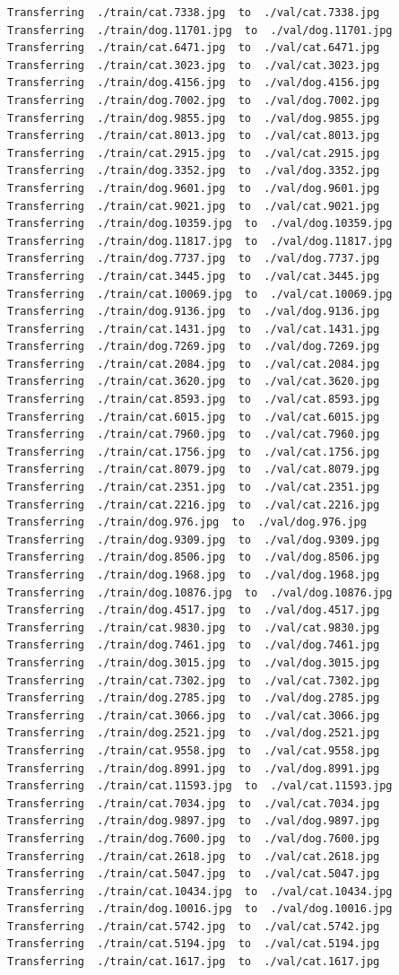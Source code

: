 \documentclass[]{book}
\theoremstyle{definition}
\theoremstyle{definition}
\theoremstyle{definition}
\theoremstyle{remark}
\begin{document}
\begin{verbatim}
Transferring  ./train/cat.7338.jpg  to  ./val/cat.7338.jpg
Transferring  ./train/dog.11701.jpg  to  ./val/dog.11701.jpg
Transferring  ./train/cat.6471.jpg  to  ./val/cat.6471.jpg
Transferring  ./train/cat.3023.jpg  to  ./val/cat.3023.jpg
Transferring  ./train/dog.4156.jpg  to  ./val/dog.4156.jpg
Transferring  ./train/dog.7002.jpg  to  ./val/dog.7002.jpg
Transferring  ./train/dog.9855.jpg  to  ./val/dog.9855.jpg
Transferring  ./train/cat.8013.jpg  to  ./val/cat.8013.jpg
Transferring  ./train/cat.2915.jpg  to  ./val/cat.2915.jpg
Transferring  ./train/dog.3352.jpg  to  ./val/dog.3352.jpg
Transferring  ./train/dog.9601.jpg  to  ./val/dog.9601.jpg
Transferring  ./train/cat.9021.jpg  to  ./val/cat.9021.jpg
Transferring  ./train/dog.10359.jpg  to  ./val/dog.10359.jpg
Transferring  ./train/dog.11817.jpg  to  ./val/dog.11817.jpg
Transferring  ./train/dog.7737.jpg  to  ./val/dog.7737.jpg
Transferring  ./train/cat.3445.jpg  to  ./val/cat.3445.jpg
Transferring  ./train/cat.10069.jpg  to  ./val/cat.10069.jpg
Transferring  ./train/dog.9136.jpg  to  ./val/dog.9136.jpg
Transferring  ./train/cat.1431.jpg  to  ./val/cat.1431.jpg
Transferring  ./train/dog.7269.jpg  to  ./val/dog.7269.jpg
Transferring  ./train/cat.2084.jpg  to  ./val/cat.2084.jpg
Transferring  ./train/cat.3620.jpg  to  ./val/cat.3620.jpg
Transferring  ./train/cat.8593.jpg  to  ./val/cat.8593.jpg
Transferring  ./train/cat.6015.jpg  to  ./val/cat.6015.jpg
Transferring  ./train/cat.7960.jpg  to  ./val/cat.7960.jpg
Transferring  ./train/cat.1756.jpg  to  ./val/cat.1756.jpg
Transferring  ./train/cat.8079.jpg  to  ./val/cat.8079.jpg
Transferring  ./train/cat.2351.jpg  to  ./val/cat.2351.jpg
Transferring  ./train/cat.2216.jpg  to  ./val/cat.2216.jpg
Transferring  ./train/dog.976.jpg  to  ./val/dog.976.jpg
Transferring  ./train/dog.9309.jpg  to  ./val/dog.9309.jpg
Transferring  ./train/dog.8506.jpg  to  ./val/dog.8506.jpg
Transferring  ./train/dog.1968.jpg  to  ./val/dog.1968.jpg
Transferring  ./train/dog.10876.jpg  to  ./val/dog.10876.jpg
Transferring  ./train/dog.4517.jpg  to  ./val/dog.4517.jpg
Transferring  ./train/cat.9830.jpg  to  ./val/cat.9830.jpg
Transferring  ./train/dog.7461.jpg  to  ./val/dog.7461.jpg
Transferring  ./train/dog.3015.jpg  to  ./val/dog.3015.jpg
Transferring  ./train/cat.7302.jpg  to  ./val/cat.7302.jpg
Transferring  ./train/dog.2785.jpg  to  ./val/dog.2785.jpg
Transferring  ./train/cat.3066.jpg  to  ./val/cat.3066.jpg
Transferring  ./train/dog.2521.jpg  to  ./val/dog.2521.jpg
Transferring  ./train/cat.9558.jpg  to  ./val/cat.9558.jpg
Transferring  ./train/dog.8991.jpg  to  ./val/dog.8991.jpg
Transferring  ./train/cat.11593.jpg  to  ./val/cat.11593.jpg
Transferring  ./train/cat.7034.jpg  to  ./val/cat.7034.jpg
Transferring  ./train/dog.9897.jpg  to  ./val/dog.9897.jpg
Transferring  ./train/dog.7600.jpg  to  ./val/dog.7600.jpg
Transferring  ./train/cat.2618.jpg  to  ./val/cat.2618.jpg
Transferring  ./train/cat.5047.jpg  to  ./val/cat.5047.jpg
Transferring  ./train/cat.10434.jpg  to  ./val/cat.10434.jpg
Transferring  ./train/dog.10016.jpg  to  ./val/dog.10016.jpg
Transferring  ./train/cat.5742.jpg  to  ./val/cat.5742.jpg
Transferring  ./train/cat.5194.jpg  to  ./val/cat.5194.jpg
Transferring  ./train/cat.1617.jpg  to  ./val/cat.1617.jpg
\end{verbatim}
\end{document}
